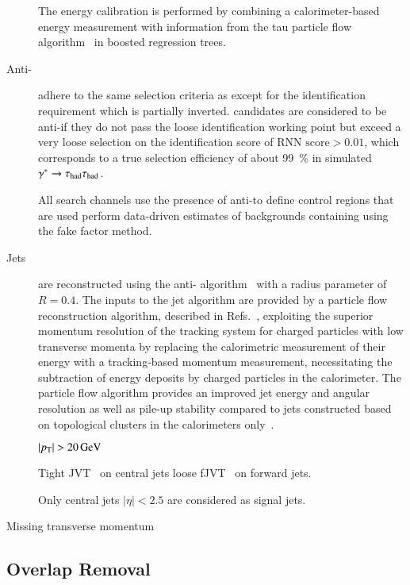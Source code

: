 \begin{description}
  The \tauhadvis energy calibration is performed by combining a
  calorimeter-based energy measurement with information from the tau
  particle flow algorithm~\cite{PERF-2014-06} in boosted regression
  trees.

\item[Anti-\tauhadvis] adhere to the same selection criteria as
  \tauhadvis except for the \tauhadvis identification requirement
  which is partially inverted. \tauhadvis candidates are considered to
  be anti-\tauhadvis if they do not pass the loose \tauhadvis
  identification working point but exceed a very loose selection on
  the \tauhadvis identification score of $\text{RNN score} > 0.01$,
  which corresponds to a true \tauhadvis selection efficiency of about
  \SI{99}{\percent} in simulated $\gamma^* \to \tau_{\text{had}}\tau_{\text{had}}$.

  All search channels use the presence of anti-\tauhadvis to define
  control regions that are used perform data-driven estimates of
  backgrounds containing \faketauhadvis using the fake factor method.


\item[Jets] are reconstructed using the anti-\kt
  algorithm~\cite{Cacciari:2008gp} with a radius parameter
  of~$R = 0.4$. The inputs to the jet algorithm are provided by a
  particle flow reconstruction algorithm, described in
  Refs.~\cite{PERF-2015-09,JETM-2018-05}, exploiting the superior
  momentum resolution of the tracking system for charged particles
  with low transverse momenta by replacing the calorimetric
  measurement of their energy with a tracking-based momentum
  measurement, necessitating the subtraction of energy deposits by
  charged particles in the calorimeter. The particle flow algorithm
  provides an improved jet energy and angular resolution as well as
  pile-up stability compared to jets constructed based on topological
  clusters in the calorimeters only~\cite{JETM-2018-05}.

  $|p_{\text{T}}| > \SI{20}{\ensuremath{\text{GeV}}}$

  Tight JVT~\cite{PERF-2014-03} on central jets loose
  fJVT~\cite{PERF-2016-06-witherratum,ATL-PHYS-PUB-2019-026} on
  forward jets.

  Only central jets $|\eta| < 2.5$ are considered as signal jets.

\item[Missing transverse momentum]

\end{description}


\subsection{Overlap Removal}

